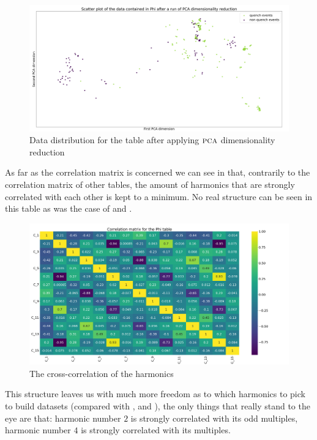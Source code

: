 \begin{figure}[h!]
	\centering
	\includegraphics[width=\linewidth]{img/Phi_distribution.png}
	\caption{Data distribution for the \phin table after applying $\textsc{pca}$ dimensionality
		reduction} \label{fig:phi-dist}
\end{figure}

\medskip

As far as the correlation matrix is concerned we can see in  that, contrarily to
the correlation matrix of other tables, the amount of harmonics that are strongly correlated with
each other is kept to a minimum. No real structure can be seen in this table as was the case of \an
and \bn.
\begin{figure}[h!]
	\centering
	\includegraphics[width=\linewidth]{img/Phi_corr_matrix.png}
	\caption{The cross-correlation of the \phin harmonics} \label{fig:phi-corr}
\end{figure}
This structure leaves us with much more freedom as to which harmonics to pick to build datasets
(compared with \an, \bn and \cnmod), the only things that really stand to the eye are that: harmonic
number $2$ is strongly correlated with its odd multiples, harmonic number $4$ is strongly correlated
with its multiples.

